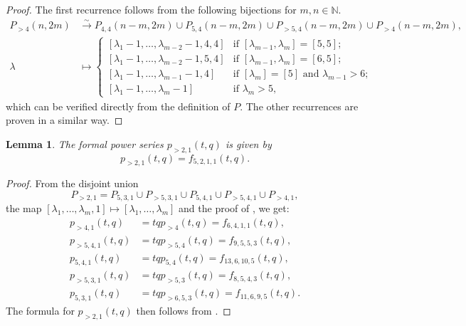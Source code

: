 \documentclass[a4paper, 12pt, reqno]{amsart}
\newtheorem{lemma}[theorem]{Lemma}
\theoremstyle{remark}
\begin{document}
\begin{proof}
  The first recurrence follows from the following bijections for $m, n \in \mathbb{N}$.
  \begin{align*}
    P_{>4}(n, 2m) &\xrightarrow{\sim} P_{4, 4}(n - m, 2m) \cup P_{5, 4}(n - m, 2m) \cup P_{>5, 4}(n - m, 2m) \cup P_{>4}(n - m, 2m), \\
    \lambda &\mapsto
              \begin{cases}
                [\lambda_1 - 1, \dots, \lambda_{m - 2} - 1, 4, 4] &\text{if $[\lambda_{m - 1}, \lambda_m] = [5, 5]$}; \\
                [\lambda_1 - 1, \dots, \lambda_{m - 2} - 1, 5, 4] &\text{if $[\lambda_{m - 1}, \lambda_m] = [6, 5]$}; \\
                [\lambda_1 - 1, \dots, \lambda_{m - 1} - 1, 4] &\text{if $[\lambda_m] = [5]$ and $\lambda_{m - 1} > 6$}; \\
                [\lambda_1 - 1, \dots, \lambda_m - 1] &\text{if $\lambda_m > 5$},
              \end{cases}
  \end{align*}
  which can be verified directly from the definition of $P$.
  The other recurrences are proven in a similar way.
\end{proof}

\begin{lemma}
  \label{lmm:3}
  The formal power series $p_{>2, 1}(t, q)$ is given by
  \begin{equation*}
    p_{>2, 1}(t, q) = f_{5, 2, 1, 1}(t, q).
  \end{equation*}
\end{lemma}

\begin{proof}
  From the disjoint union
  \begin{equation*}
    P_{>2, 1} = P_{5, 3, 1} \cup P_{>5, 3, 1} \cup P_{5, 4, 1} \cup P_{>5, 4, 1} \cup P_{>4, 1},
  \end{equation*}
  the map $[\lambda_1, \dots, \lambda_m, 1] \mapsto [\lambda_1, \dots, \lambda_m]$ and the proof of , we get:
  \begin{align*}
    p_{>4, 1}(t, q) &= tqp_{>4}(t, q) = f_{6, 4, 1, 1}(t, q), \\
    p_{>5, 4, 1}(t, q) &= tqp_{>5, 4}(t, q) = f_{9, 5, 5, 3}(t, q), \\
    p_{5, 4, 1}(t, q) &= tqp_{5, 4}(t, q) = f_{13, 6, 10, 5}(t, q), \\
    p_{>5, 3, 1}(t, q) &= tqp_{>5, 3}(t, q) = f_{8, 5, 4, 3}(t, q), \\
    p_{5, 3, 1}(t, q) &= tqp_{>6, 5, 3}(t, q) = f_{11, 6, 9, 5}(t, q).
  \end{align*}
  The formula for $p_{>2, 1}(t, q)$ then follows from .
\end{proof}
\end{document}
